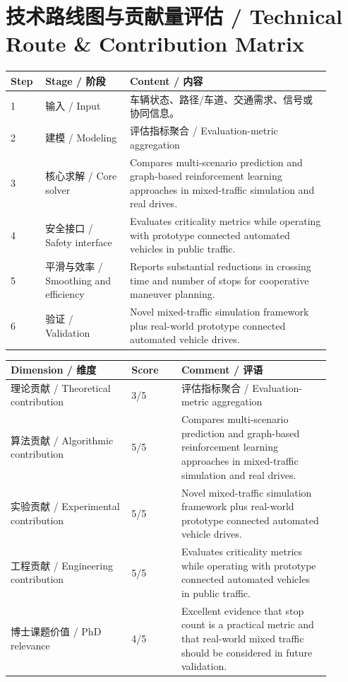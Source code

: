 \documentclass[UTF8,a4paper,11pt,fontset=fandol]{ctexart}
\begin{document}
\section{技术路线图与贡献量评估 / Technical Route \& Contribution Matrix}
\begin{longtable}{p{0.08\linewidth}p{0.24\linewidth}p{0.58\linewidth}}
\toprule
Step & Stage / 阶段 & Content / 内容\\
\midrule
1 & 输入 / Input & 车辆状态、路径/车道、交通需求、信号或协同信息。 \\
2 & 建模 / Modeling & 评估指标聚合 / Evaluation-metric aggregation \\
3 & 核心求解 / Core solver & Compares multi-scenario prediction and graph-based reinforcement learning approaches in mixed-traffic simulation and real drives. \\
4 & 安全接口 / Safety interface & Evaluates criticality metrics while operating with prototype connected automated vehicles in public traffic. \\
5 & 平滑与效率 / Smoothing and efficiency & Reports substantial reductions in crossing time and number of stops for cooperative maneuver planning. \\
6 & 验证 / Validation & Novel mixed-traffic simulation framework plus real-world prototype connected automated vehicle drives. \\
\bottomrule
\end{longtable}

\begin{longtable}{p{0.34\linewidth}p{0.14\linewidth}p{0.42\linewidth}}
\toprule
Dimension / 维度 & Score & Comment / 评语\\
\midrule
理论贡献 / Theoretical contribution & 3/5 & 评估指标聚合 / Evaluation-metric aggregation \\
算法贡献 / Algorithmic contribution & 5/5 & Compares multi-scenario prediction and graph-based reinforcement learning approaches in mixed-traffic simulation and real drives. \\
实验贡献 / Experimental contribution & 5/5 & Novel mixed-traffic simulation framework plus real-world prototype connected automated vehicle drives. \\
工程贡献 / Engineering contribution & 5/5 & Evaluates criticality metrics while operating with prototype connected automated vehicles in public traffic. \\
博士课题价值 / PhD relevance & 4/5 & Excellent evidence that stop count is a practical metric and that real-world mixed traffic should be considered in future validation. \\
\bottomrule
\end{longtable}
\end{document}
